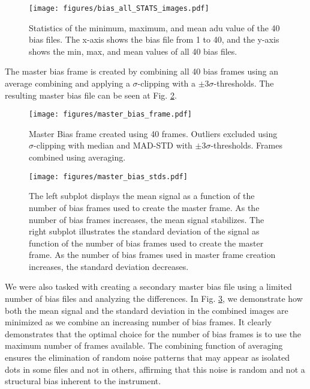 \documentclass[twocolumn]{aastex631}
\begin{document}
\begin{figure}[ht!]
    \begin{centering}
        \texttt{[image: figures/bias\_all\_STATS\_images.pdf]}
        \caption{Statistics of the minimum, maximum, and mean adu value of the 40 bias files. The x-axis shows the bias file from 1 to 40, and the y-axis shows the min, max, and mean values of all 40 bias files.}
        \label{fig:bias_STATS}
    \end{centering}
\end{figure}

The master bias frame is created by combining all 40 bias frames using an average combining and applying a $\sigma$-clipping with a $\pm3\sigma$-thresholds. The resulting master bias file can be seen at Fig. \ref{fig:master_bias}.

\begin{figure}[ht!]
    \begin{centering}
        \texttt{[image: figures/master\_bias\_frame.pdf]}
        \caption{
            Master Bias frame created using 40 frames. Outliers excluded using $\sigma$-clipping with median and MAD-STD with $\pm3\sigma$-thresholds. Frames combined using averaging.
        }
        \label{fig:master_bias}
    \end{centering}
\end{figure}


\begin{figure}[ht!]
    \begin{centering}
        \texttt{[image: figures/master\_bias\_stds.pdf]}
        \caption{The left subplot  displays the mean signal as a function of the number of bias frames used to create the master frame. As the number of bias frames increases, the mean signal stabilizes. 
        The right subplot illustrates the standard deviation of the signal as function of the number of bias frames used to create the master frame. As the number of bias frames used in master frame creation increases, the standard deviation decreases.}
        \label{fig:bias_frame_stats}
    \end{centering}
\end{figure}
We were also tasked with creating a secondary master bias file using a limited number of bias files and analyzing the differences. In Fig. \ref{fig:bias_frame_stats}, we demonstrate how both the mean signal and the standard deviation in the combined images are minimized as we combine an increasing number of bias frames. It clearly demonstrates that the optimal choice for the number of bias frames is to use the maximum number of frames available. The combining function of averaging ensures the elimination of random noise patterns that may appear as isolated dots in some files and not in others, affirming that this noise is random and not a structural bias inherent to the instrument.
\end{document}
